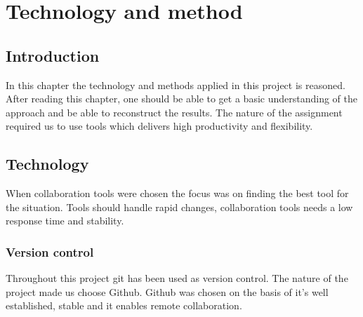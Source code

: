 \chapter{Technology and method}

\section{Introduction}
In this chapter the technology and methods applied in this project is reasoned. After reading this chapter, one should be able to get a basic understanding of the approach and be able to reconstruct the results. The nature of the assignment required us to use tools which delivers high productivity and flexibility. 

\section{Technology} %
When collaboration tools were chosen the focus was on finding the best tool for the situation. Tools should handle rapid changes, collaboration tools needs a low response time and stability. %

\subsection{Version control}
Throughout this project git has been used as version control. The nature of the project made us choose Github. Github was chosen on the basis of it's well established, stable and it enables remote collaboration.


